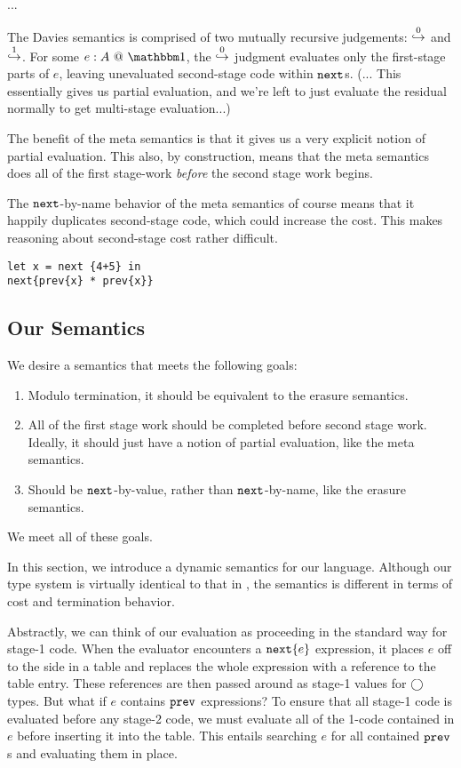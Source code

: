 ...

The Davies semantics is comprised of two mutually recursive judgements: $\overset 0 \hookrightarrow$ and $\overset 1 \hookrightarrow$.  For some $\colone e A$, the $\overset 0 \hookrightarrow$ judgment evaluates only the first-stage parts of $e$, leaving unevaluated second-stage code within ${\tt next}$s.  (... This essentially gives us partial evaluation, and we're left to just evaluate the residual normally to get multi-stage evaluation...) 

The benefit of the meta semantics is that it gives us a very explicit notion of partial evaluation.  This also, by construction, means that the meta semantics does all of the first stage-work {\em before} the second stage work begins. 

The ${\tt next}$-by-name behavior of the meta semantics of course means that it happily duplicates second-stage code, which could increase the cost.  This makes reasoning about second-stage cost rather difficult.

\begin{lstlisting} 
let x = next {4+5} in
next{prev{x} * prev{x}}
\end{lstlisting}

\subsection{Our Semantics}

We desire a semantics that meets the following goals:

\begin{enumerate}
\item Modulo termination, it should be equivalent to the erasure semantics.
\item All of the first stage work should be completed before second stage work.  Ideally, it should just have a notion of partial evaluation, like the meta semantics.
\item Should be ${\tt next}$-by-value, rather than ${\tt next}$-by-name, like the erasure semantics.  
\end{enumerate}

We meet all of these goals.

In this section, we introduce a dynamic semantics for our language.  Although our type system is virtually identical to that in \cite{davies96}, the semantics is different in terms of cost and termination behavior. 

Abstractly, we can think of our evaluation as proceeding in the standard way for stage-1 code. When the evaluator encounters a ${\tt next} \{e\}$ expression, it places $e$ off to the side in a table and replaces the whole expression with a reference to the table entry.  These references are then passed around as stage-1 values for $\bigcirc$ types.  But what if $e$ contains ${\tt prev}$ expressions?  To ensure that all stage-1 code is evaluated before any stage-2 code, we must evaluate all of the 1-code contained in $e$ before inserting it into the table.  This entails searching $e$ for all contained ${\tt prev}$s and evaluating them in place.  

